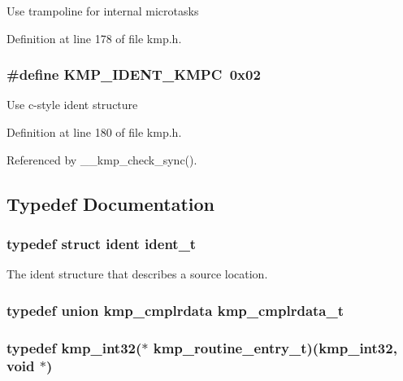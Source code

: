 Use trampoline for internal microtasks 

Definition at line 178 of file kmp.\-h.

\hypertarget{group__BASIC__TYPES_ga50e3ecb5eb8d70f437a84a8b2bc9e88f}{
\subsubsection[{K\-M\-P\-\_\-\-I\-D\-E\-N\-T\-\_\-\-K\-M\-P\-C}]{\setlength{\rightskip}{0pt plus 5cm}\#define K\-M\-P\-\_\-\-I\-D\-E\-N\-T\-\_\-\-K\-M\-P\-C~0x02}}\label{group__BASIC__TYPES_ga50e3ecb5eb8d70f437a84a8b2bc9e88f}
Use c-\/style ident structure 

Definition at line 180 of file kmp.\-h.



Referenced by \-\_\-\-\_\-kmp\-\_\-check\-\_\-sync().



\subsection{Typedef Documentation}
\hypertarget{group__BASIC__TYPES_ga690fda6b92f039a72db263c6b4394ddb}{
\subsubsection[{ident\-\_\-t}]{\setlength{\rightskip}{0pt plus 5cm}typedef struct {\bf ident}  {\bf ident\-\_\-t}}}\label{group__BASIC__TYPES_ga690fda6b92f039a72db263c6b4394ddb}
The ident structure that describes a source location. \hypertarget{group__BASIC__TYPES_gad4583610db83a88008a785b332fdfd39}{
\subsubsection[{kmp\-\_\-cmplrdata\-\_\-t}]{\setlength{\rightskip}{0pt plus 5cm}typedef union {\bf kmp\-\_\-cmplrdata}  {\bf kmp\-\_\-cmplrdata\-\_\-t}}}\label{group__BASIC__TYPES_gad4583610db83a88008a785b332fdfd39}
\hypertarget{group__BASIC__TYPES_ga76e21422ff9984d9bafd0b36277ae115}{
\subsubsection[{kmp\-\_\-routine\-\_\-entry\-\_\-t}]{\setlength{\rightskip}{0pt plus 5cm}typedef kmp\-\_\-int32($\ast$  kmp\-\_\-routine\-\_\-entry\-\_\-t)(kmp\-\_\-int32, {\bf void} $\ast$)}}\label{group__BASIC__TYPES_ga76e21422ff9984d9bafd0b36277ae115}


